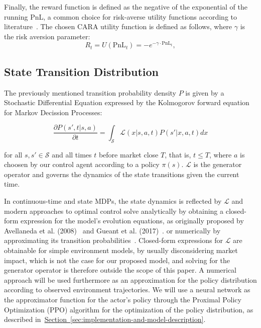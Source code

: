 Finally, the reward function is defined as the negative of the exponential of the running PnL, a common choice for risk-averse utility functions according to literature~\cite{Gueant2022, Selser2021a, FalcesMarin2022}.
The chosen CARA utility function is defined as follows, where \( \gamma \) is the risk aversion parameter:
\[
    R_t = U(\text{PnL}_t) = -e^{-\gamma \cdot \text{PnL}_t},
\]

\subsection{State Transition Distribution}
\label{subsec:state-transition-distribution}

The previously mentioned transition probability density $P$ is given by a Stochastic Differential Equation expressed by the Kolmogorov forward equation for Markov Decission Processes:

\begin{equation}
    \label{eq:equation2}
    \frac{\partial P(s', t | s, a)}{\partial t}  = \int_{\mathcal{S}} \mathcal{L}(x | s, a, t) P(s'| x, a, t) dx
\end{equation}

for all $s, s' \in \mathcal{S}$ and all times $t$ before market close $T$, that is, $t \le T$,
where $a$ is choosen by our control agent according to a policy $\pi (s)$.
$\mathcal{L}$ is the generator operator and governs the dynamics of the state transitions given the current time.

In continuous-time and state MDPs, the state dynamics is reflected by $\mathcal{L}$ and modern approaches to optimal control
solve analytically by obtaining a closed-form expression for the model's evolution equations, as originally proposed by
Avellaneda et al. (2008)~\cite{Avellaneda2008} and Gueant et al. (2017)~\cite{Gueant2017}.
or numerically by approximating its transition probabilities~\cite{Gueant2022, Selser2021a, FalcesMarin2022}.
Closed-form expressions for $\mathcal{L}$ are obtainable for simple environment models, by usually disconsidering market impact,
which is not the case for our proposed model, and solving for the generator operator is therefore outside the scope of this paper.
A numerical approach will be used furthermore as an approximation for the policy distribution according to observed environment trajectories.
We will use a neural network as the approximator function for the actor's policy through the Proximal Policy Optimization (PPO) algorithm
for the optimization of the policy distribution, as described in~\hyperref[sec:implementation-and-models]{Section~\ref*{sec:implementation-and-model-description}}.
